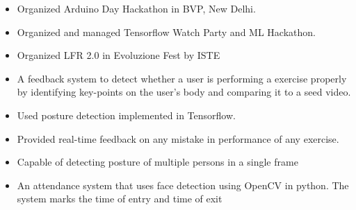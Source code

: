 
\begin{itemize}
    \item Organized Arduino Day Hackathon in BVP, New Delhi.
    \item Organized and managed Tensorflow Watch Party and ML Hackathon.
    \item Organized LFR 2.0 in Evoluzione Fest by ISTE
\end{itemize}








\begin{itemize}
\item A feedback system to detect whether a user is performing a exercise properly by identifying key-points on the user's body and comparing it to a seed video.
\item Used posture detection implemented in \newline Tensorflow.
\item Provided real-time feedback on any mistake in performance of any exercise. 
\item Capable of detecting posture of multiple \newline persons in a single frame
\end{itemize}

\smallskip
\smallskip

\begin{itemize}
\item An attendance system that uses face detection using OpenCV in python. The system marks the time of entry and time of exit 
\end{itemize}
\smallskip
\smallskip

